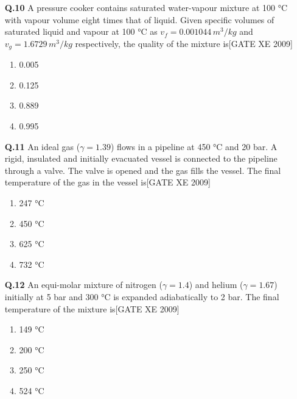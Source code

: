 \documentclass[journal,12pt,onecolumn]{IEEEtran}
\theoremstyle{remark}
\begin{document}
\begin{enumerate}
\begin{enumerate}
\begin{enumerate}
\vspace{0.3cm}

\item[\textbf{Q.10}]A pressure cooker contains saturated water-vapour mixture at 100 °C with vapour volume eight times that of liquid. Given specific volumes of saturated liquid and vapour at 100 °C as $v_f=0.001044\,m^3/kg$ and $v_g=1.6729\,m^3/kg$ respectively, the quality of the mixture is\hfill[GATE XE 2009]
\begin{multicols}{2}
\begin{enumerate}
    \item 0.005
    \item 0.125
    \item 0.889
    \item 0.995
\end{enumerate}
\end{multicols}

\vspace{0.3cm}

\item[\textbf{Q.11}] An ideal gas ($\gamma=1.39$) flows in a pipeline at 450 °C and 20 bar. A rigid, insulated and initially evacuated vessel is connected to the pipeline through a valve. The valve is opened and the gas fills the vessel. The final temperature of the gas in the vessel is\hfill[GATE XE 2009]
\begin{multicols}{2}
\begin{enumerate}
    \item 247 °C
    \item 450 °C
    \item 625 °C
    \item 732 °C
\end{enumerate}
\end{multicols}

\vspace{0.3cm}

\item[\textbf{Q.12}] An equi-molar mixture of nitrogen ($\gamma=1.4$) and helium ($\gamma=1.67$) initially at 5 bar and 300 °C is expanded adiabatically to 2 bar. The final temperature of the mixture is\hfill[GATE XE 2009]
\begin{multicols}{2}
\begin{enumerate}
    \item 149 °C
    \item 200 °C
    \item 250 °C
    \item 524 °C
\end{enumerate}
\end{multicols}


\end{enumerate}
\end{enumerate}
\end{enumerate}
\end{document}
